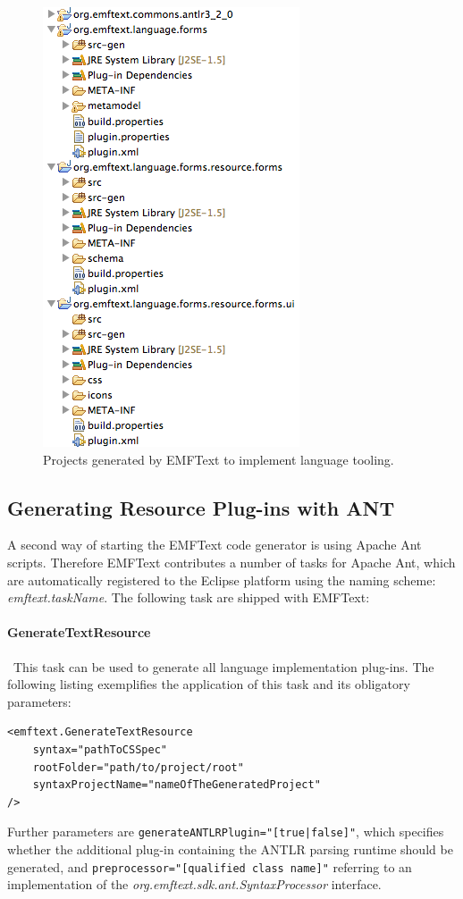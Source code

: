 	\begin{figure}[ht]
	\centering
		\includegraphics[scale=0.7]{figures/generationResults}
	\caption{Projects generated by EMFText to implement language tooling.}
	\label{fig:generationResults}
	\end{figure}

	\subsection{Generating Resource Plug-ins with ANT}
	\label{sec:process_generating_ant}
	A second way of starting the EMFText code generator is using Apache Ant
	scripts. Therefore EMFText contributes a number of tasks for Apache Ant,
	which are automatically registered to the Eclipse platform using the
	naming scheme: \emph{emftext.taskName}. The following task are shipped with
	EMFText:
	
	\paragraph*{GenerateTextResource}~This task can be used to generate all
	language implementation plug-ins. The following listing exemplifies the
	application of this task and its obligatory parameters:
\begin{lstlisting}
<emftext.GenerateTextResource
	syntax="pathToCSSpec"
	rootFolder="path/to/project/root"
	syntaxProjectName="nameOfTheGeneratedProject"
/>
\end{lstlisting}
	Further parameters are \texttt{generateANTLRPlugin="[true|false]"}, which
	specifies whether the additional plug-in
	containing the ANTLR parsing runtime should be generated, and
	\texttt{pre\-processor="[qualified class name]"} referring to an implementation
	of the \emph{org.emftext.sdk.\-ant.Syntax\-Processor} interface. 
	
